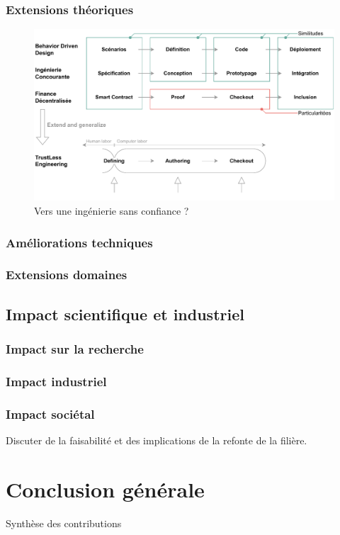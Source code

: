 \documentclass[a4paper,12pt]{article}
\begin{document}
\subsubsection{Extensions théoriques}
\label{sec:org963887d}

\begin{figure}[htbp]
\centering
\includegraphics[width=.9\linewidth]{./svg/long-term-goal.pdf}
\caption{\label{fig:orgef31dea}Vers une ingénierie sans confiance ?}
\end{figure}
\subsubsection{Améliorations techniques}
\label{sec:orgc8ad6c2}
\subsubsection{Extensions domaines}
\label{sec:org5eb0d36}
\subsection{Impact scientifique et industriel}
\label{sec:org102ad1c}
\subsubsection{Impact sur la recherche}
\label{sec:orgd1f370d}
\subsubsection{Impact industriel}
\label{sec:orgeb80b94}
\subsubsection{Impact sociétal}
\label{sec:orga3abb6d}
Discuter de la faisabilité et des implications de la refonte de la filière.
\clearpage
\section{Conclusion générale}
\label{sec:orga7a5af7}
Synthèse des contributions
\end{document}
